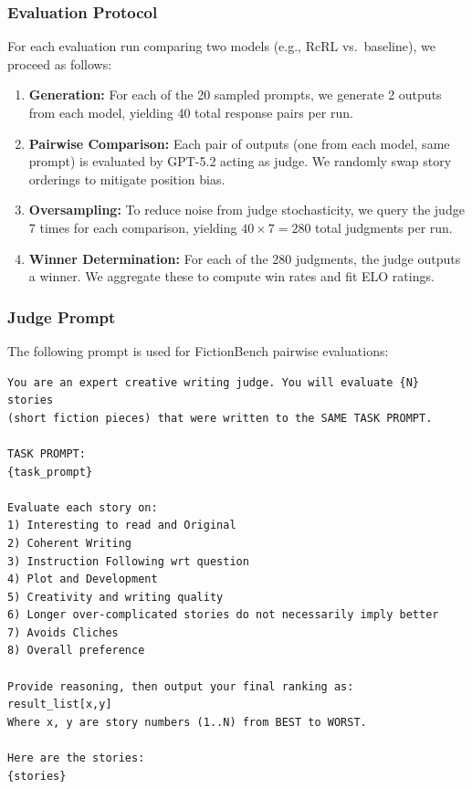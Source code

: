 \documentclass{article}
\theoremstyle{plain}
\theoremstyle{definition}
\theoremstyle{remark}
\begin{document}
    
    
    
    
    
    
    
    
    
    
    
    
    
    
    
    
    
    
    
    
    
    
    
 \subsubsection{Evaluation Protocol}

For each evaluation run comparing two models (e.g., RcRL vs.\ baseline), we proceed as follows:

\begin{enumerate}
    \item \textbf{Generation:} For each of the 20 sampled prompts, we generate 2 outputs from each model, yielding 40 total response pairs per run.
    \item \textbf{Pairwise Comparison:} Each pair of outputs (one from each model, same prompt) is evaluated by GPT-5.2 acting as judge. We randomly swap story orderings to mitigate position bias.
    \item \textbf{Oversampling:} To reduce noise from judge stochasticity, we query the judge 7 times for each comparison, yielding $40 \times 7 = 280$ total judgments per run.
    \item \textbf{Winner Determination:} For each of the 280 judgments, the judge outputs a winner. We aggregate these to compute win rates and fit ELO ratings.
\end{enumerate}

\subsubsection{Judge Prompt}

The following prompt is used for FictionBench pairwise evaluations:

\begin{tcolorbox}[colback=gray!5, colframe=gray!50, title=FictionBench Judge Prompt, breakable]
\small
\begin{verbatim}
You are an expert creative writing judge. You will evaluate {N} stories 
(short fiction pieces) that were written to the SAME TASK PROMPT.

TASK PROMPT:
{task_prompt}

Evaluate each story on:
1) Interesting to read and Original
2) Coherent Writing
3) Instruction Following wrt question
4) Plot and Development
5) Creativity and writing quality
6) Longer over-complicated stories do not necessarily imply better
7) Avoids Cliches
8) Overall preference

Provide reasoning, then output your final ranking as:
result_list[x,y]
Where x, y are story numbers (1..N) from BEST to WORST.

Here are the stories:
{stories}
\end{verbatim}
\end{tcolorbox}
\end{document}
